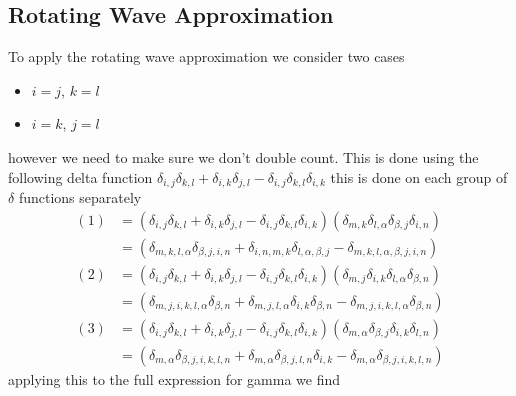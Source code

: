 \subsection{Rotating Wave Approximation}
To apply the rotating wave approximation we consider
two cases
\begin{itemize}
  \item \(i=j\), \(k=l\)
  \item \(i=k\), \(j=l\)
\end{itemize}
however we need to make sure we don't
double count. This is done using
the following delta
function
\(\delta_{i,j}\delta_{k,l}
+ \delta_{i,k}\delta_{j,l}
- \delta_{i,j}\delta_{k,l}
\delta_{i,k}\)
this is done on each group of
\(\delta \) functions separately
\begin{align}
  (1) & =  (\delta_{i,j}\delta_{k,l}
  + \delta_{i,k}\delta_{j,l}
  - \delta_{i,j}\delta_{k,l}\delta_{i,k}) (
  \delta_{m, k}\delta_{l, \alpha}
  \delta_{\beta, j}\delta_{i, n})                          \\
      & =  (\delta_{m, k, l, \alpha}\delta_{\beta, j,i, n}
  + \delta_{i, n, m, k}\delta_{l, \alpha, \beta, j}
  - \delta_{m, k, l, \alpha, \beta, j,i, n})               \\
  (2) & =  (\delta_{i,j}\delta_{k,l}
  + \delta_{i,k}\delta_{j,l}
  - \delta_{i,j}\delta_{k,l}
  \delta_{i,k}) (
  \delta_{m, j}\delta_{i, k}
  \delta_{l, \alpha}\delta_{\beta, n})                     \\
      & =  (\delta_{m, j,i, k,l, \alpha}\delta_{\beta, n}
  + \delta_{m, j,l, \alpha}\delta_{i, k}\delta_{\beta, n}
  - \delta_{m, j,i, k, l, \alpha}\delta_{\beta, n} )       \\
  (3) & =  (\delta_{i,j}\delta_{k,l}
  + \delta_{i,k}\delta_{j,l}
  - \delta_{i,j}\delta_{k,l}
  \delta_{i,k}) (
  \delta_{m, \alpha}\delta_{\beta, j}
  \delta_{i, k}\delta_{l, n})                              \\
      & =  (\delta_{m, \alpha}\delta_{\beta, j,i, k, l, n}
  + \delta_{m, \alpha}\delta_{\beta, j,l, n}
  \delta_{i, k}
  - \delta_{m, \alpha}\delta_{\beta, j,i, k,l, n})
\end{align}
applying this to the full expression
for gamma we find



